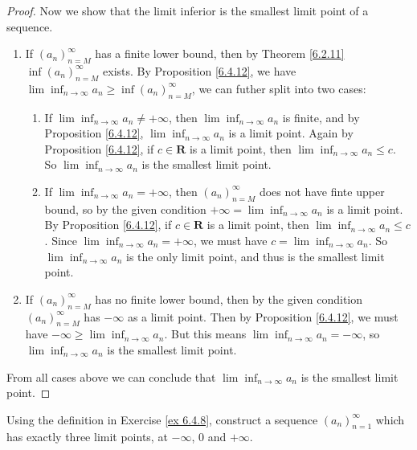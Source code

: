 \begin{proof}
    Now we show that the limit inferior is the smallest limit point of a sequence.
    \begin{enumerate}
        \item If \((a_n)_{n = M}^\infty\) has a finite lower bound, then by Theorem \ref{6.2.11} \(\inf(a_n)_{n = M}^\infty\) exists.
              By Proposition \ref{6.4.12}, we have \(\lim\inf_{n \to \infty} a_n \geq \inf(a_n)_{n = M}^\infty\), we can futher split into two cases:
              \begin{enumerate}[label=(\Roman*)]
                  \item If \(\lim\inf_{n \to \infty} a_n \neq +\infty\), then \(\lim\inf_{n \to \infty} a_n\) is finite, and by Proposition \ref{6.4.12}, \(\lim\inf_{n \to \infty} a_n\) is a limit point.
                        Again by Proposition \ref{6.4.12}, if \(c \in \mathbf{R}\) is a limit point, then \(\lim\inf_{n \to \infty} a_n \leq c\).
                        So \(\lim\inf_{n \to \infty} a_n\) is the smallest limit point.
                  \item If \(\lim\inf_{n \to \infty} a_n = +\infty\), then \((a_n)_{n = M}^\infty\) does not have finte upper bound, so by the given condition \(+\infty = \lim\inf_{n \to \infty} a_n\) is a limit point.
                        By Proposition \ref{6.4.12}, if \(c \in \mathbf{R}\) is a limit point, then \(\lim\inf_{n \to \infty} a_n \leq c\).
                        Since \(\lim\inf_{n \to \infty} a_n = +\infty\), we must have \(c = \lim\inf_{n \to \infty} a_n\).
                        So \(\lim\inf_{n \to \infty} a_n\) is the only limit point, and thus is the smallest limit point.
              \end{enumerate}
        \item If \((a_n)_{n = M}^\infty\) has no finite lower bound, then by the given condition \((a_n)_{n = M}^\infty\) has \(-\infty\) as a limit point.
              Then by Proposition \ref{6.4.12}, we must have \(-\infty \geq \lim\inf_{n \to \infty} a_n\).
              But this means \(\lim\inf_{n \to \infty} a_n = -\infty\), so \(\lim\inf_{n \to \infty} a_n\) is the smallest limit point.
    \end{enumerate}
    From all cases above we can conclude that \(\lim\inf_{n \to \infty} a_n\) is the smallest limit point.
\end{proof}

\begin{exercise}\label{ex 6.4.9}
    Using the definition in Exercise \ref{ex 6.4.8}, construct a sequence \((a_n)_{n = 1}^\infty\) which has exactly three limit points, at \(-\infty\), \(0\) and \(+\infty\).
\end{exercise}

